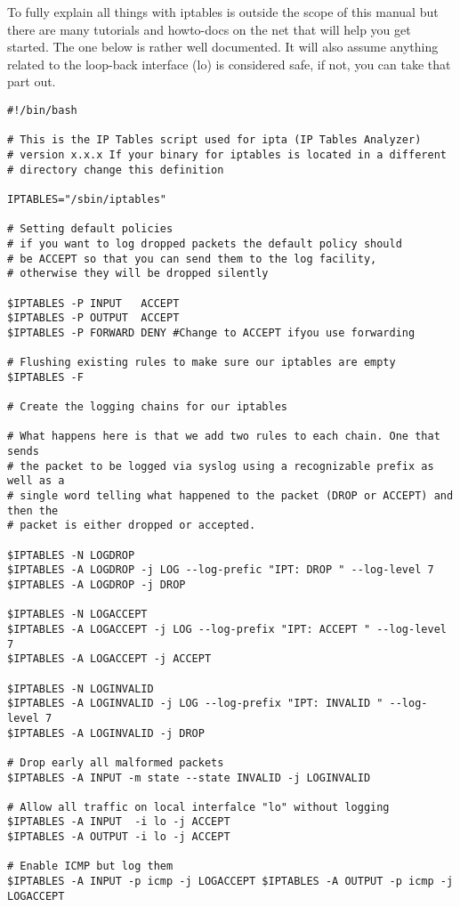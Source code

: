 \documentclass[english,twoside,openright,a4paper,12pt]{article}
\begin{document}
To fully explain all things with iptables is outside the scope of this manual but there are many tutorials and howto-docs on the net that will help you get started. The one below is rather well documented. It will also assume anything related to the loop-back interface (lo) is considered safe, if not, you can take that part out.

\small

\begin{verbatim}
#!/bin/bash

# This is the IP Tables script used for ipta (IP Tables Analyzer) 
# version x.x.x If your binary for iptables is located in a different 
# directory change this definition

IPTABLES="/sbin/iptables"

# Setting default policies
# if you want to log dropped packets the default policy should 
# be ACCEPT so that you can send them to the log facility, 
# otherwise they will be dropped silently 

$IPTABLES -P INPUT   ACCEPT
$IPTABLES -P OUTPUT  ACCEPT
$IPTABLES -P FORWARD DENY #Change to ACCEPT ifyou use forwarding

# Flushing existing rules to make sure our iptables are empty 
$IPTABLES -F

# Create the logging chains for our iptables

# What happens here is that we add two rules to each chain. One that sends
# the packet to be logged via syslog using a recognizable prefix as well as a 
# single word telling what happened to the packet (DROP or ACCEPT) and then the 
# packet is either dropped or accepted.

$IPTABLES -N LOGDROP
$IPTABLES -A LOGDROP -j LOG --log-prefic "IPT: DROP " --log-level 7
$IPTABLES -A LOGDROP -j DROP

$IPTABLES -N LOGACCEPT
$IPTABLES -A LOGACCEPT -j LOG --log-prefix "IPT: ACCEPT " --log-level 7 
$IPTABLES -A LOGACCEPT -j ACCEPT

$IPTABLES -N LOGINVALID
$IPTABLES -A LOGINVALID -j LOG --log-prefix "IPT: INVALID " --log-level 7 
$IPTABLES -A LOGINVALID -j DROP

# Drop early all malformed packets
$IPTABLES -A INPUT -m state --state INVALID -j LOGINVALID

# Allow all traffic on local interfalce "lo" without logging 
$IPTABLES -A INPUT  -i lo -j ACCEPT
$IPTABLES -A OUTPUT -i lo -j ACCEPT

# Enable ICMP but log them
$IPTABLES -A INPUT -p icmp -j LOGACCEPT $IPTABLES -A OUTPUT -p icmp -j LOGACCEPT


\end{verbatim}
\end{document}
